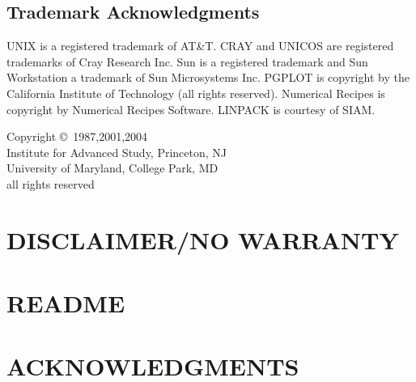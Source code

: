 \documentclass[headsepline,normalheadings]{book}
\begin{document}
\section*{Trademark Acknowledgments}
UNIX is a registered trademark of AT\&T.
CRAY and UNICOS are registered trademarks of Cray Research Inc.
Sun is a registered trademark and Sun Workstation a trademark of Sun
Microsystems Inc.
PGPLOT is copyright by the California Institute of Technology (all
rights reserved).
Numerical Recipes is copyright by Numerical Recipes Software.
LINPACK is courtesy of SIAM.


\begin{center}
\vspace{2 in}
Copyright \copyright\ 1987,2001,2004\\
Institute for Advanced Study, Princeton, NJ\\
University of Maryland, College Park, MD\\
all rights reserved
\end{center}
\normalsize
\vspace*{\fill}
\cleardoublepage
\pagestyle{headings}
\tableofcontents
\newpage
{}
\listoftables
\newpage
{}
\listoffigures
\newpage

\chapter*{DISCLAIMER/NO WARRANTY}


\chapter*{README}


\chapter*{ACKNOWLEDGMENTS}

\end{document}
